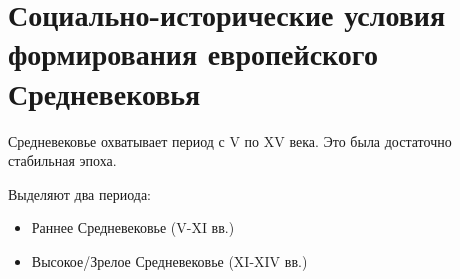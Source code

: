 \section{Социально-исторические условия формирования европейского Средневековья}





Средневековье охватывает период с V по XV века. Это была достаточно стабильная эпоха.

Выделяют два периода:
\begin{itemize}
    \item Раннее Средневековье (V-XI вв.)
    \item Высокое/Зрелое Средневековье (XI-XIV вв.)
\end{itemize}

